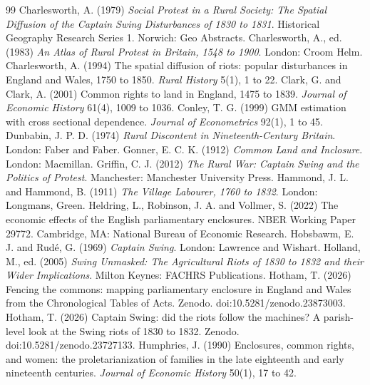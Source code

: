\documentclass[11pt,a4paper]{article}
\begin{document}
\begin{thebibliography}{99}
 Charlesworth, A. (1979) \textit{Social Protest in a Rural Society: The Spatial Diffusion of the Captain Swing Disturbances of 1830 to 1831}. Historical Geography Research Series 1. Norwich: Geo Abstracts.
 Charlesworth, A., ed. (1983) \textit{An Atlas of Rural Protest in Britain, 1548 to 1900}. London: Croom Helm.
 Charlesworth, A. (1994) The spatial diffusion of riots: popular disturbances in England and Wales, 1750 to 1850. \textit{Rural History} 5(1), 1 to 22.
 Clark, G. and Clark, A. (2001) Common rights to land in England, 1475 to 1839. \textit{Journal of Economic History} 61(4), 1009 to 1036.
 Conley, T. G. (1999) GMM estimation with cross sectional dependence. \textit{Journal of Econometrics} 92(1), 1 to 45.
 Dunbabin, J. P. D. (1974) \textit{Rural Discontent in Nineteenth-Century Britain}. London: Faber and Faber.
 Gonner, E. C. K. (1912) \textit{Common Land and Inclosure}. London: Macmillan.
 Griffin, C. J. (2012) \textit{The Rural War: Captain Swing and the Politics of Protest}. Manchester: Manchester University Press.
 Hammond, J. L. and Hammond, B. (1911) \textit{The Village Labourer, 1760 to 1832}. London: Longmans, Green.
 Heldring, L., Robinson, J. A. and Vollmer, S. (2022) The economic effects of the English parliamentary enclosures. NBER Working Paper 29772. Cambridge, MA: National Bureau of Economic Research.
 Hobsbawm, E. J. and Rud\'e, G. (1969) \textit{Captain Swing}. London: Lawrence and Wishart.
 Holland, M., ed. (2005) \textit{Swing Unmasked: The Agricultural Riots of 1830 to 1832 and their Wider Implications}. Milton Keynes: FACHRS Publications.
 Hotham, T. (2026) Fencing the commons: mapping parliamentary enclosure in England and Wales from the Chronological Tables of Acts. Zenodo. doi:10.5281/zenodo.23873003.
 Hotham, T. (2026) Captain Swing: did the riots follow the machines? A parish-level look at the Swing riots of 1830 to 1832. Zenodo. doi:10.5281/zenodo.23727133.
 Humphries, J. (1990) Enclosures, common rights, and women: the proletarianization of families in the late eighteenth and early nineteenth centuries. \textit{Journal of Economic History} 50(1), 17 to 42.

\end{thebibliography}
\end{document}
